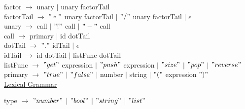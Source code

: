 \documentclass{article}
\begin{document}
factor $\rightarrow$ unary $\vert$ unary factorTail \\

factorTail $\rightarrow$ $"*"$ unary factorTail $\vert$ $"/"$ unary factorTail $\vert$ $\epsilon$ \\

unary $\rightarrow$ call $\vert$ $"!"$ call $\vert$ $"-"$ call \\

call $\rightarrow$ primary $\vert$ id dotTail \\

dotTail $\rightarrow$ $"."$ idTail $\vert$ $\epsilon$ \\

idTail $\rightarrow$ id dotTail $\vert$ listFunc dotTail \\

listFunc $\rightarrow$ $"get"$ expression $\vert$ $"push"$ expression $\vert$ $"size"$ $\vert$ $"pop"$ $\vert$ $"reverse"$ \\

primary $\rightarrow$ $"true"$ $\vert$ $"false"$ $\vert$ number $\vert$ string $\vert$ $"("$ expression $")"$ \\

\underline{Lexical Grammar}

type $\rightarrow$ $"number"$ $\vert$ $"bool"$ $\vert$ $"string"$ $\vert$ $"list"$ \\
\end{document}
